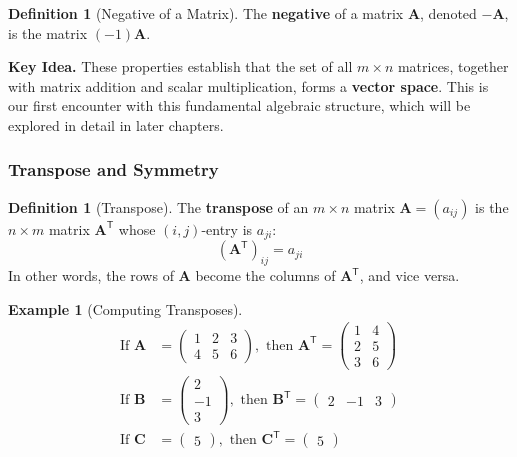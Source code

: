 \documentclass[12pt]{article}
\numberwithin{equation}{section}
\newcommand{\mat}[1]{\mathbf{#1}}        %
\newcommand{\trans}{\mathsf{T}}          %
\theoremstyle{plain}
\theoremstyle{definition}
\newtheorem{definition}[theorem]{Definition}
\newtheorem{example}[theorem]{Example}
\theoremstyle{remark}
\newenvironment{keyidea}{\begin{tcolorbox}\textbf{Key Idea.}}{\end{tcolorbox}}
\begin{document}
\begin{definition}[Negative of a Matrix]
The \textbf{negative} of a matrix $\mat{A}$, denoted $-\mat{A}$, is the matrix $(-1)\mat{A}$.
\end{definition}

\begin{keyidea}
These properties establish that the set of all $m \times n$ matrices, together with matrix addition and scalar multiplication, forms a \textbf{vector space}. This is our first encounter with this fundamental algebraic structure, which will be explored in detail in later chapters.
\end{keyidea}

\subsubsection{Transpose and Symmetry}

\begin{definition}[Transpose]
The \textbf{transpose} of an $m \times n$ matrix $\mat{A} = (a_{ij})$ is the $n \times m$ matrix $\mat{A}^{\trans}$ whose $(i,j)$-entry is $a_{ji}$:
$$(\mat{A}^{\trans})_{ij} = a_{ji}$$
In other words, the rows of $\mat{A}$ become the columns of $\mat{A}^{\trans}$, and vice versa.
\end{definition}

\begin{example}[Computing Transposes]
\begin{align}
\text{If } \mat{A} &= \begin{pmatrix} 1 & 2 & 3 \\ 4 & 5 & 6 \end{pmatrix}, \text{ then } \mat{A}^{\trans} = \begin{pmatrix} 1 & 4 \\ 2 & 5 \\ 3 & 6 \end{pmatrix}\\[0.5em]
\text{If } \mat{B} &= \begin{pmatrix} 2 \\ -1 \\ 3 \end{pmatrix}, \text{ then } \mat{B}^{\trans} = \begin{pmatrix} 2 & -1 & 3 \end{pmatrix}\\[0.5em]
\text{If } \mat{C} &= \begin{pmatrix} 5 \end{pmatrix}, \text{ then } \mat{C}^{\trans} = \begin{pmatrix} 5 \end{pmatrix}
\end{align}
\end{example}
\end{document}

